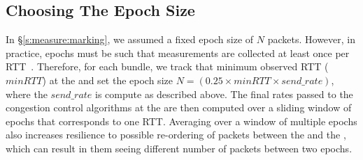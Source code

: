 


\subsection{Choosing The Epoch Size}
\label{s:measure:epoch}
%

In \S\ref{s:measure:marking}, we assumed a fixed epoch size of $N$ packets. However, in practice, epochs must be such that measurements are collected at least once per RTT~\cite{ccp}. Therefore, for each bundle, we track that minimum observed RTT ($minRTT$) at the \inbox and set the epoch size $N = (0.25 \times minRTT \times send\_rate)$, where the $send\_rate$ is compute as described above. The final rates passed to the congestion control algorithms at the \inbox are then computed over a sliding window of epochs that corresponds to one RTT. Averaging over a window of multiple epochs also increases resilience to possible re-ordering of packets between the \inbox and the \outbox, which can result in them seeing different number of packets between two epochs.


